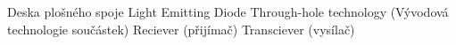 \cleardoublepage
\chapter*{\listofabbrevname}
{}

\begin{acronym}[KolikMista]
		{Deska plošného spoje}
		{Light Emitting Diode}
		{Through-hole technology (Vývodová technologie součástek)}
		{Reciever (přijímač)}
		{Transciever (vysílač)}
\end{acronym}
